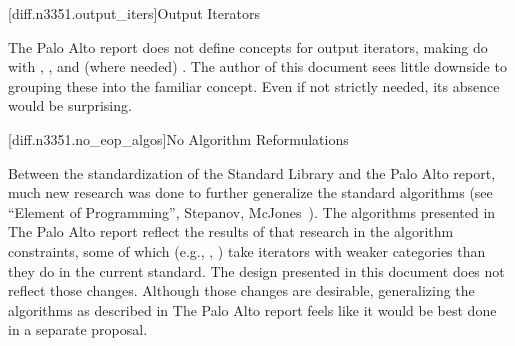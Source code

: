 [diff.n3351.output_iters]{Output Iterators}

\pnum
The Palo Alto report does not define concepts for output iterators, making do with
, , and (where needed) . The
author of this document sees little downside to grouping these into the familiar
 concept. Even if not strictly needed, its absence would be surprising.

[diff.n3351.no_eop_algos]{No Algorithm Reformulations}

\pnum
Between the standardization of the Standard Library and the Palo Alto report, much new research was
done to further generalize the standard algorithms
(see ``Element of Programming'', Stepanov, McJones~\cite{Stepanov:2009:EP:1614221}). The algorithms
presented in The Palo Alto report reflect the results of that research in the algorithm constraints,
some of which (e.g., , ) take iterators with weaker categories than
they do in the current standard. The design presented in this document does not reflect those
changes. Although those changes are desirable, generalizing the algorithms as described in The Palo
Alto report feels like it would be best done in a separate proposal.
